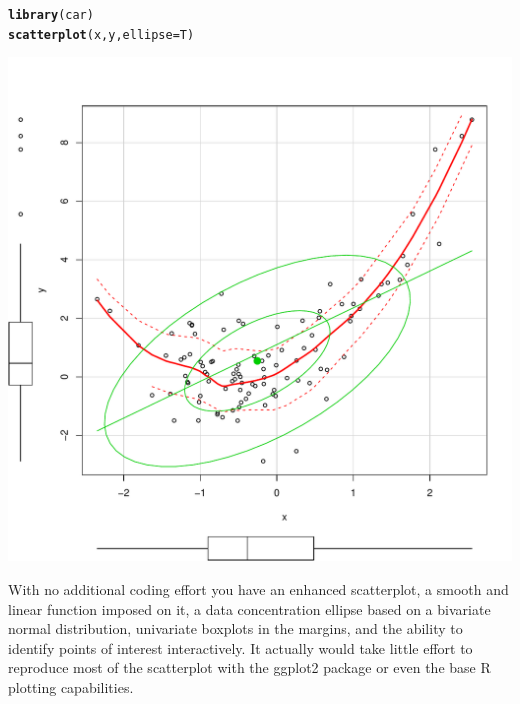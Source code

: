 \documentclass[english,nohyper,titlepage]{tufte-handout}\usepackage[]{graphicx}\usepackage[]{color}
\makeatletter
\newcommand{\hlstd}[1]{\textcolor[rgb]{0.345,0.345,0.345}{#1}}%
\newcommand{\hlkwc}[1]{\textcolor[rgb]{0.333,0.667,0.333}{#1}}%
\newcommand{\hlkwd}[1]{\textcolor[rgb]{0.737,0.353,0.396}{\textbf{#1}}}%
\newenvironment{kframe}{%
 \def\at@end@of@kframe{}%
 \ifinner\ifhmode%
  \def\at@end@of@kframe{\end{minipage}}%
  \begin{minipage}{\columnwidth}%
 \fi\fi%
 \def\FrameCommand##1{\hskip\@totalleftmargin \hskip-\fboxsep
 \colorbox{shadecolor}{##1}\hskip-\fboxsep
     \hskip-\linewidth \hskip-\@totalleftmargin \hskip\columnwidth}%
 \MakeFramed {\advance\hsize-\width
   \@totalleftmargin\z@ \linewidth\hsize
   \@setminipage}}%
 {\par\unskip\endMakeFramed%
 \at@end@of@kframe}
\newenvironment{knitrout}{}{} %
\makeatother
\begin{document}
\begin{knitrout}\footnotesize
{}\color{fgcolor}\begin{kframe}
\begin{alltt}
\hlkwd{library}\hlstd{(car)}
\hlkwd{scatterplot}\hlstd{(x, y,} \hlkwc{ellipse}\hlstd{=T)}
\end{alltt}
\end{kframe}

{\centering \includegraphics[width=.49\linewidth]{figure/carDemo} 

}



\end{knitrout}

With no additional coding effort you have an enhanced scatterplot, a smooth and linear function imposed on it, a data concentration ellipse based on a bivariate normal distribution, univariate boxplots in the margins, and the ability to identify points of interest interactively.  It actually would take little effort to reproduce most of the scatterplot with the ggplot2 package or even the base R plotting capabilities.
\end{document}
